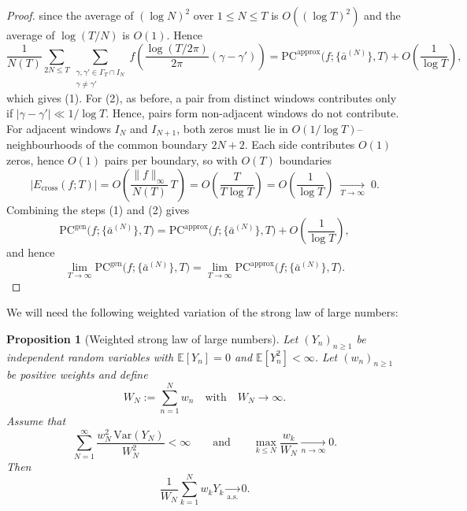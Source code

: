 \documentclass[12pt,reqno]{amsart}
\theoremstyle{plain}
\newtheorem{prop}{Proposition}[section]
\theoremstyle{definition}
\theoremstyle{remark}
\begin{document}
\begin{proof}
since the average of $(\log N)^2$ over $1 \le N \le T$ is $O((\log T)^2)$
and the average of $\log(T/N)$ is $O(1)$. Hence
\begin{equation}
\frac{1}{N(T)}\sum_{2N\le T}
\!\!\sum_{\substack{\gamma,\gamma'\in\Gamma_T\cap I_N\\ \gamma\ne\gamma'}}
f\!\left(\frac{\log(T/2\pi)}{2\pi}(\gamma-\gamma')\right)
=
\mathrm{PC}^{\mathrm{approx}}\!\bigl(f;\{\bar a^{(N)}\},T\bigr)
+O\!\left(\frac{1}{\log T}\right),
\end{equation}
which gives (1). 
For (2), as before, a pair from distinct windows contributes only if
$|\gamma-\gamma'|\ll 1/\log T$. Hence, pairs form non-adjacent windows do not contribute. For
adjacent windows $I_N$ and $I_{N+1}$, both zeros must lie in
$O(1/\log T)$–neighbourhoods of the common boundary $2N+2$. Each side contributes
$O(1)$ zeros, hence $O(1)$ pairs per boundary, so with $O(T)$ boundaries
\begin{equation}
|E_{\mathrm{cross}}(f;T)|
= O\!\left(\frac{\|f\|_\infty}{N(T)} \, T \right)
= O\!\left(\frac{T}{T \log T}\right)
= O\!\left(\frac{1}{\log T}\right)
\;\xrightarrow[T \to \infty]{}\; 0.
\end{equation}
Combining the steps (1) and (2) gives
\begin{equation}
\mathrm{PC}^{\mathrm{gen}}\!\bigl(f;\{\bar a^{(N)}\},T\bigr)
=
\mathrm{PC}^{\mathrm{approx}}\!\bigl(f;\{\bar a^{(N)}\},T\bigr)
+O\!\left(\frac{1}{\log T}\right),
\end{equation}
and hence
\begin{equation}
\lim_{T\to\infty}
\mathrm{PC}^{\mathrm{gen}}\!\bigl(f;\{\bar a^{(N)}\},T\bigr)
=
\lim_{T\to\infty}
\mathrm{PC}^{\mathrm{approx}}\!\bigl(f;\{\bar a^{(N)}\},T\bigr).
\end{equation}
\end{proof}

We will need the following weighted variation of the strong law of large numbers:

\begin{prop}[Weighted strong law of large numbers]
\label{prop:SLLN}
Let $(Y_n)_{n\ge1}$ be independent random variables with $\mathbb{E}[Y_n]=0$ and 
$\mathbb{E}[Y_n^2]<\infty$.  
Let $(w_n)_{n\ge1}$ be positive weights and define
\begin{equation}
W_N := \sum_{n=1}^N w_n \quad \text{with} \quad W_N \to \infty.
\end{equation}
Assume that
\begin{equation}\label{eq:var-sum}
\sum_{N=1}^\infty \frac{w_N^2\,\mathrm{Var}(Y_N)}{W_N^2}<\infty
\qquad\text{and}\qquad
\max_{k\le N}\frac{w_k}{W_N}\xrightarrow[n\to\infty]{}0.
\end{equation}
Then
\begin{equation}\label{eq:goal}
\frac{1}{W_N}\sum_{k=1}^N w_k Y_k \xrightarrow[\mathrm{a.s.}]{} 0 .
\end{equation}
\end{prop}
\end{document}
